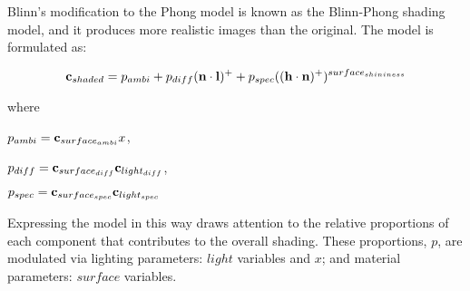 Blinn's modification to the Phong model is known as the Blinn-Phong shading model, and it produces more realistic images than the original. The model is formulated as:

\vspace{-0.3cm}

\begin{equation} \label{eq:BlinnPhong}
	\mathbf{c}_{shaded} = p_{ambi} + p_{diff}(\mathbf{n}\cdot\mathbf{l})^+ + p_{spec}((\mathbf{h}\cdot\mathbf{n})^+)^{surface_{shininess}}
\end{equation}

where

\vspace{0.3cm}


\noindent\begin{minipage}{.33\linewidth}
	\centering
	\begin{math}p_{ambi} = \mathbf{c}_{surface_{ambi}}x\end{math},
\end{minipage}
\noindent\begin{minipage}{.33\linewidth}
	\centering
	\begin{math}p_{diff} = \mathbf{c}_{surface_{diff}}\mathbf{c}_{light_{diff}}\end{math},
\end{minipage}
\noindent\begin{minipage}{.33\linewidth}
	\centering
	\begin{math}p_{spec} = \mathbf{c}_{surface_{spec}}\mathbf{c}_{light_{spec}}\end{math}
\end{minipage}

\vspace{0.3cm}

Expressing the model in this way draws attention to the relative proportions of each component that contributes to the overall shading. These proportions, \begin{math}p\end{math}, are modulated via lighting parameters:  \begin{math}light\end{math} variables and \begin{math}x\end{math}; and material parameters: \begin{math}surface\end{math} variables.

